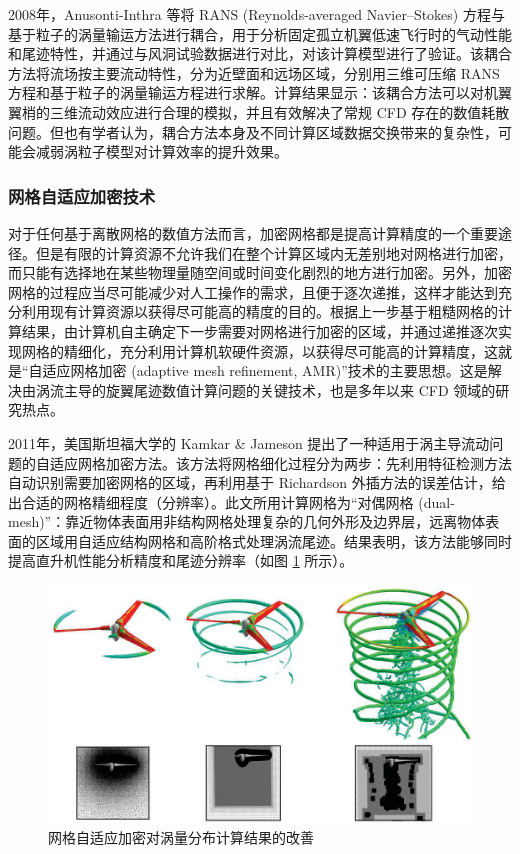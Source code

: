 2008年，Anusonti-Inthra 等将 RANS
(Reynolds-averaged Navier–Stokes) 方程与基于粒子的涡量输运方法进行耦合，用于分析固定孤立机翼低速飞行时的气动性能和尾迹特性，并通过与风洞试验数据进行对比，对该计算模型进行了验证。该耦合方法将流场按主要流动特性，分为近壁面和远场区域，分别用三维可压缩
RANS 方程和基于粒子的涡量输运方程进行求解。计算结果显示：该耦合方法可以对机翼翼梢的三维流动效应进行合理的模拟，并且有效解决了常规
CFD 存在的数值耗散问题。但也有学者认为，耦合方法本身及不同计算区域数据交换带来的复杂性，可能会减弱涡粒子模型对计算效率的提升效果。

\subsubsection{网格自适应加密技术}

对于任何基于离散网格的数值方法而言，加密网格都是提高计算精度的一个重要途径。但是有限的计算资源不允许我们在整个计算区域内无差别地对网格进行加密，而只能有选择地在某些物理量随空间或时间变化剧烈的地方进行加密。另外，加密网格的过程应当尽可能减少对人工操作的需求，且便于逐次递推，这样才能达到充分利用现有计算资源以获得尽可能高的精度的目的。根据上一步基于粗糙网格的计算结果，由计算机自主确定下一步需要对网格进行加密的区域，并通过递推逐次实现网格的精细化，充分利用计算机软硬件资源，以获得尽可能高的计算精度，这就是“自适应网格加密
(adaptive mesh refinement, AMR)”技术的主要思想。这是解决由涡流主导的旋翼尾迹数值计算问题的关键技术，也是多年以来
CFD 领域的研究热点。

2011年，美国斯坦福大学的 Kamkar \& Jameson 提出了一种适用于涡主导流动问题的自适应网格加密方法。该方法将网格细化过程分为两步：先利用特征检测方法自动识别需要加密网格的区域，再利用基于
Richardson 外插方法的误差估计，给出合适的网格精细程度（分辨率）。此文所用计算网格为“对偶网格 (dual-mesh)”：靠近物体表面用非结构网格处理复杂的几何外形及边界层，远离物体表面的区域用自适应结构网格和高阶格式处理涡流尾迹。结果表明，该方法能够同时提高直升机性能分析精度和尾迹分辨率（如图
\ref{fig:AMR} 所示）。
\begin{figure}[h!]
\centering{}\includegraphics[width=1\textwidth,height=0.24\textheight,keepaspectratio]{../review/figures/adaptive}
\caption{\label{fig:AMR}网格自适应加密对涡量分布计算结果的改善}
\end{figure}


